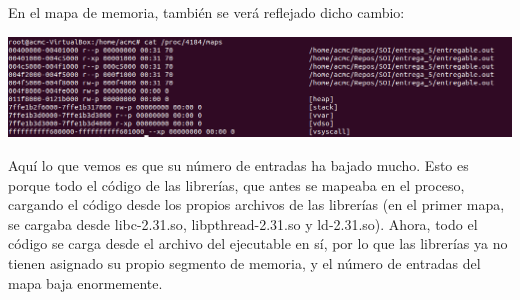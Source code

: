 \documentclass[a4paper]{article}
\begin{document}
En el mapa de memoria, también se verá reflejado dicho cambio:

\includegraphics[scale=0.408]{Captura_estatico.png}

Aquí lo que vemos es que su número de entradas ha bajado mucho. Esto es porque todo el código de las librerías, que antes se mapeaba en el proceso, cargando el código desde los propios archivos de las librerías (en el primer mapa, se cargaba desde {\ttfamily libc-2.31.so}, {\ttfamily libpthread-2.31.so} y {\ttfamily ld-2.31.so}). Ahora, todo el código se carga desde el archivo del ejecutable en sí, por lo que las librerías ya no tienen asignado su propio segmento de memoria, y el número de entradas del mapa baja enormemente.
\end{document}
